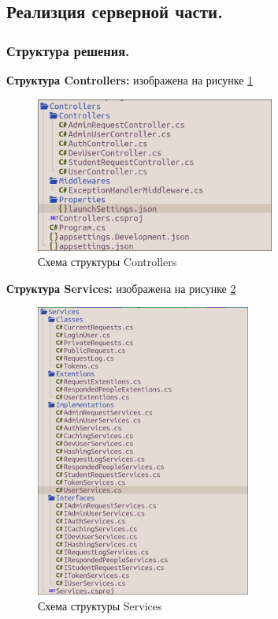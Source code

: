 \subsection{Реализция серверной части.}

\subsubsection{Структура решения.}

\textbf{Структура Controllers:} изображена на рисунке \ref{fig:Controllers}
\begin{figure}[!h]
    \centering
    \includegraphics[width = 0.7\textwidth]{imgs/Controllers.png}
    \caption{Схема структуры Controllers}
    \label{fig:Controllers}
\end{figure}

\textbf{Структура Services:} изображена на рисунке \ref{fig:Services}
\newpage
\begin{figure}[!h]
    \centering
    \includegraphics[width = 0.63\textwidth]{imgs/Services.png}
    \caption{Схема структуры Services}
    \label{fig:Services}
\end{figure}

